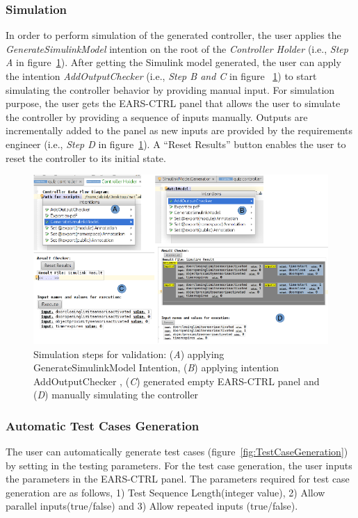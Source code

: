 \subsubsection{Simulation}
\vspace{-.2cm}
In order to perform simulation of the generated controller, the user applies the \emph{GenerateSimulinkModel} intention on the root of the
\emph{Controller Holder} (i.e., \emph{Step A}  in figure~\ref{fig:SimulationSteps}). After getting the Simulink model generated,
the user can apply the intention \emph{AddOutputChecker} (i.e., \emph{Step B
and C} in figure ~\ref{fig:SimulationSteps}) to start simulating
the controller behavior by providing manual input. For simulation purpose, the user gets the \textsf{EARS-CTRL} panel that allows the user to simulate the controller by providing a sequence of inputs manually.
Outputs are incrementally added to the panel as new inputs are provided by the
requirements engineer (i.e., \emph{Step D} in figure~\ref{fig:SimulationSteps}).
A \textsf{“Reset Results”} button enables the user to reset the
controller to its initial state.
\begin{figure}[!h]
\centering
\includegraphics[width=1\textwidth]{./images/Simulation_Steps.png}
\caption{Simulation steps for validation: (\emph{A}) applying
GenerateSimulinkModel Intention, (\emph{B}) applying intention
\textsf{AddOutputChecker} , (\emph{C}) generated empty
\textsf{EARS-CTRL} panel and (\emph{D}) manually simulating the controller}
\label{fig:SimulationSteps}
\end{figure}
\vspace{-.3cm}
\subsubsection{Automatic Test Cases Generation} 
\vspace{-.5cm}
The user can automatically generate test cases
(figure~\ref{fig:TestCaseGeneration}) by setting in the testing parameters.
For the test case generation, the user inputs the
parameters in the \textsf{EARS-CTRL} panel.
The parameters required for test case generation are as follows, 1) \textsf{Test
Sequence Length(integer value)}, 2) \textsf{Allow parallel inputs(true/false)} and 3) \textsf{Allow repeated inputs (true/false)}.